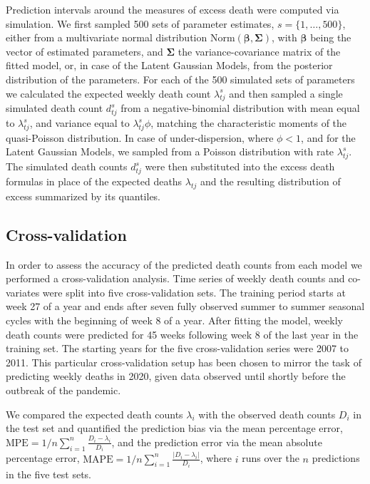 \documentclass[12pt]{article}
\begin{document}
Prediction intervals around the measures of excess death were computed via simulation. We first sampled 500 sets of parameter estimates, $s=\{1,\ldots,500\}$, either from a multivariate normal distribution $\text{Norm}(\boldsymbol{\beta}, \boldsymbol{\Sigma})$, with $\boldsymbol{\beta}$ being the vector of estimated parameters, and $\boldsymbol{\Sigma}$ the variance-covariance matrix of the fitted model, or, in case of the Latent Gaussian Models, from the posterior distribution of the parameters. For each of the 500 simulated sets of parameters we calculated the expected weekly death count $\lambda_{tj}^s$ and then sampled a single simulated death count $d_{tj}^s$ from a negative-binomial distribution with mean equal to $\lambda_{tj}^s$, and variance equal to $\lambda_{tj}^s\phi$, matching the characteristic moments of the quasi-Poisson distribution. In case of under-dispersion, where $\phi<1$, and for the Latent Gaussian Models, we sampled from a Poisson distribution with rate $\lambda_{tj}^s$. The simulated death counts $d_{tj}^s$ were then substituted into the excess death formulas in place of the expected deaths $\lambda_{tj}$ and the resulting distribution of excess summarized by its quantiles.

\subsection*{Cross-validation}

In order to assess the accuracy of the predicted death counts from each model we performed a cross-validation analysis. Time series of weekly death counts and co-variates were split into five cross-validation sets. The training period starts at week 27 of a year and ends after seven fully observed summer to summer seasonal cycles with the beginning of week 8 of a year. After fitting the model, weekly death counts were predicted for 45 weeks following week 8 of the last year in the training set. The starting years for the five cross-validation series were 2007 to 2011. This particular cross-validation setup has been chosen to mirror the task of predicting weekly deaths in 2020, given data observed until shortly before the outbreak of the pandemic.

We compared the expected death counts $\lambda_i$ with the observed death counts $D_i$ in the test set and quantified the prediction bias via the mean percentage error, $\text{MPE} = 1/n\sum_{i=1}^n \frac {D_i - \lambda_i} {D_i}$, and the prediction error via the mean absolute percentage error, $\text{MAPE} = 1/n\sum_{i=1}^n\frac {|D_i - \lambda_i|} {D_i}$, where $i$ runs over the $n$ predictions in the five test sets.
\end{document}
